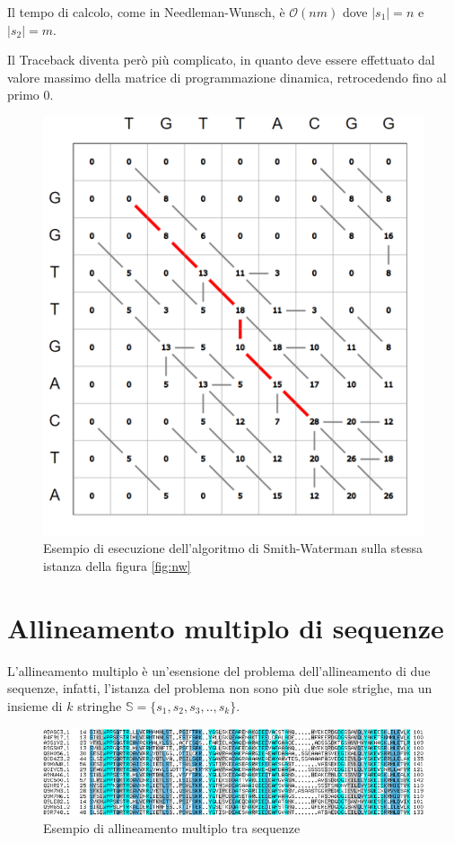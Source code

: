 Il tempo di calcolo, come in Needleman-Wunsch, è $\mathcal{O}(nm)$ dove $|s_1|=n$ e $|s_2|=m$.

Il Traceback diventa però più complicato, in quanto deve essere effettuato dal valore massimo della matrice di programmazione dinamica, retrocedendo fino al primo 0.

\begin{figure}[ht]
    \centering
    \includegraphics[scale=0.45]{images/esempio sw.PNG}
    \caption{Esempio di esecuzione dell'algoritmo di Smith-Waterman sulla stessa istanza della figura \ref{fig:nw}}
    \label{fig:sw}
\end{figure}

\clearpage
\section{Allineamento multiplo di sequenze}

L'allineamento multiplo è un'esensione del problema dell'allineamento di due sequenze, infatti, l'istanza del problema non sono più due sole strighe, ma un insieme di $k$ stringhe $\mathbb{S}=\{s_1,s_2,s_3,..,s_k\}$.

\begin{figure}[ht]
    \centering
    \includegraphics[scale=0.5]{images/multiple sequence alignment.png}
    \caption{Esempio di allineamento multiplo tra sequenze}
    \label{fig:mul_al}
\end{figure}

